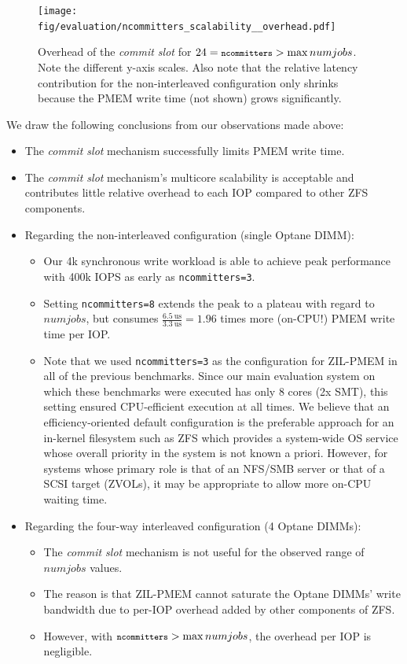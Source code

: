 \documentclass[12pt,a4paper,twoside]{book}
\begin{document}
{\begin{figure}[H]
    \centering
    \texttt{[image: fig/evaluation/ncommitters\_scalability\_\_overhead.pdf]}
    \caption{
        Overhead of the \textit{commit slot} for $24 = {\texttt{\footnotesize ncommitters}} > \max numjobs$.
        Note the different y-axis scales.
        Also note that the relative latency contribution for the non-interleaved configuration only shrinks because the PMEM write time (not shown) grows significantly.}
    \label{fig:eval:ncommitters_scalability:overhead}
\end{figure}


We draw the following conclusions from our observations made above:
\begin{itemize}[noitemsep]
    \item The \textit{commit slot} mechanism successfully limits PMEM write time.
    \item The \textit{commit slot} mechanism's multicore scalability is acceptable and contributes little relative overhead to each IOP compared to other ZFS components.
    \item Regarding the non-interleaved configuration (single Optane DIMM):
        \begin{itemize}
            \item Our 4k synchronous write workload is able to achieve peak performance with 400k IOPS as early as \lstinline{ncommitters=3}.
            \item Setting \lstinline{ncommitters=8} extends the peak to a plateau with regard to $numjobs$, but consumes $\frac{6.5~\text{us}}{3.3~\text{us}} = 1.96$ times more (on-CPU!) PMEM write time per IOP.
            \item Note that we used \lstinline{ncommitters=3} as the configuration for ZIL-PMEM in all of the previous benchmarks.
                Since our main evaluation system on which these benchmarks were executed has only 8 cores (2x SMT), this setting ensured CPU-efficient execution at all times.
                We believe that an efficiency-oriented default configuration is the preferable approach for an in-kernel filesystem such as ZFS which provides a system-wide OS service whose overall priority in the system is not known a priori.
                However, for systems whose primary role is that of an NFS/SMB server or that of a SCSI target (ZVOLs), it may be appropriate to allow more on-CPU waiting time.
        \end{itemize}
    \item Regarding the four-way interleaved configuration (4 Optane DIMMs):
        \begin{itemize}
            \item The \textit{commit slot} mechanism is not useful for the observed range of $numjobs$ values.
            \item The reason is that ZIL-PMEM cannot saturate the Optane DIMMs' write bandwidth due to per-IOP overhead added by other components of ZFS.
            \item However, with ${\texttt{\footnotesize ncommitters}} > \max numjobs$, the overhead per IOP is negligible.
        \end{itemize}
\end{itemize}

}
\end{document}
